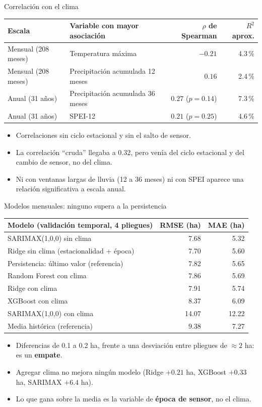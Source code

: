\documentclass[10pt]{beamer}
\begin{document}
\begin{frame}{Correlación con el clima}
\centering
\small
\begin{tabular}{llrr}
\toprule
Escala & Variable con mayor asociación & $\rho$ de Spearman & $R^2$ aprox. \\
\midrule
Mensual (208 meses) & Temperatura máxima & $-0.21$ & 4.3\,\% \\
Mensual (208 meses) & Precipitación acumulada 12 meses & $0.16$ & 2.4\,\% \\
Anual (31 años) & Precipitación acumulada 36 meses & $0.27$ ($p=0.14$) & 7.3\,\% \\
Anual (31 años) & SPEI-12 & $0.21$ ($p=0.25$) & 4.6\,\% \\
\bottomrule
\end{tabular}
\vspace{3mm}
\begin{itemize}
\item Correlaciones sin ciclo estacional y sin el salto de sensor.
\item La correlación ``cruda'' llegaba a 0.32, pero venía del ciclo estacional y del cambio de sensor, no del clima.
\item Ni con ventanas largas de lluvia (12 a 36 meses) ni con SPEI aparece una relación significativa a escala anual.
\end{itemize}
\end{frame}

\begin{frame}{Modelos mensuales: ninguno supera a la persistencia}
\centering
\small
\begin{tabular}{lrr}
\toprule
Modelo (validación temporal, 4 pliegues) & RMSE (ha) & MAE (ha) \\
\midrule
SARIMAX(1,0,0) sin clima & 7.68 & 5.32 \\
Ridge sin clima (estacionalidad + época) & 7.70 & 5.60 \\
Persistencia: último valor (referencia) & 7.82 & 5.65 \\
Random Forest con clima & 7.86 & 5.69 \\
Ridge con clima & 7.91 & 5.74 \\
XGBoost con clima & 8.37 & 6.09 \\
SARIMAX(1,0,0) con clima & 14.07 & 12.22 \\
Media histórica (referencia) & 9.38 & 7.27 \\
\bottomrule
\end{tabular}
\vspace{3mm}
\begin{itemize}
\item Diferencias de 0.1 a 0.2 ha, frente a una desviación entre pliegues de ${\approx}2$ ha: es un \textbf{empate}.
\item Agregar clima no mejora ningún modelo (Ridge $+0.21$ ha, XGBoost $+0.33$ ha, SARIMAX $+6.4$ ha).
\item Lo que gana sobre la media es la variable de \textbf{época de sensor}, no el clima.
\end{itemize}
\end{frame}
\end{document}
